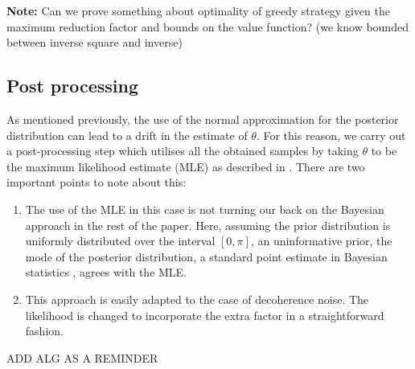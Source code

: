 {\color{red} {\bf Note:} Can we prove something about optimality of greedy strategy given the maximum reduction factor and bounds on the value function? (we know bounded between inverse square and inverse)}



\subsection{Post processing}\label{sec::post}
As mentioned previously, the use of the normal approximation for the posterior distribution can lead to a drift in the estimate of $\theta$. For this reason, we carry out a post-processing step which utilises all the obtained samples by taking $\theta$ to be the maximum likelihood estimate (MLE) as described in \cite{}. There are two important points to note about this:
\begin{enumerate}\item The use of the MLE in this case is not turning our back on the Bayesian approach in the rest of the paper. Here, assuming the prior distribution is uniformly distributed over the interval $[0,\pi]$, an uninformative prior, the mode of the posterior distribution, a standard point estimate in Bayesian statistics \cite{}, agrees with the MLE.
\item This approach is easily adapted to the case of decoherence noise. The likelihood is changed to incorporate the extra factor in a straightforward fashion.
\end{enumerate}

ADD ALG AS A REMINDER

\newpage
